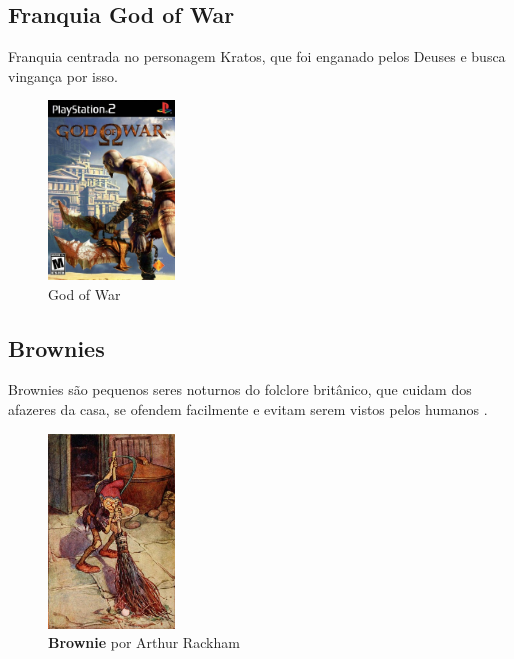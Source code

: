 \subsection{Franquia God of War}

Franquia centrada no personagem Kratos, que foi enganado pelos Deuses e busca
vingança por isso.

\begin{figure}[!htb] \caption{\label{god_of_war}God of War} \begin{center}
\includegraphics[width=0.3\textwidth]{imagens/GodofWar.jpg} \end{center}
 \end{figure}

\clearpage

\subsection{Brownies}

Brownies são pequenos seres noturnos do folclore britânico, que cuidam dos
afazeres da casa, se ofendem facilmente e evitam serem vistos pelos humanos
\cite{britannica_2011}\cite{carolyn_2016}.

\begin{figure}[!htb]
    \caption{\label{fig_brownie}\textbf{Brownie} por Arthur Rackham }
    \begin{center} \includegraphics[width=0.3\textwidth]{imagens/brownie.jpg}
    \end{center}  \end{figure}


